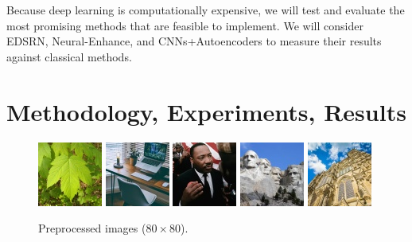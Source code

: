 \documentclass[letterpaper,12pt]{article}
\begin{document}
Because deep learning is computationally expensive, we will test and evaluate the most promising methods that are feasible to implement. We will consider EDSRN, Neural-Enhance, and CNNs+Autoencoders to measure their results against classical methods.

\pagebreak
\section*{Methodology, Experiments, Results}

\begin{figure}[h!]
    \includegraphics[width=.2\textwidth]{small-test-set_processed/green-maple-leaf.jpg}\hfill
    \includegraphics[width=.2\textwidth]{small-test-set_processed/home-office.jpg}\hfill
    \includegraphics[width=.2\textwidth]{small-test-set_processed/martin-luther-king.jpg}\hfill
    \includegraphics[width=.2\textwidth]{small-test-set_processed/mount-rushmore.jpg}\hfill
    \includegraphics[width=.2\textwidth]{small-test-set_processed/salisbury-cathedral.jpg}
    \caption{Preprocessed images ($80\times80$).}
\end{figure}
\end{document}
